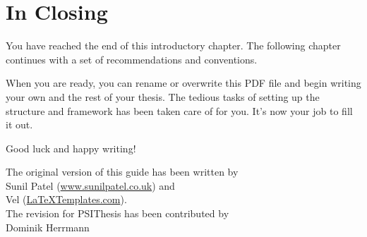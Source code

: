 \section{In Closing}

You have reached the end of this introductory chapter. The following chapter continues with a set of recommendations and conventions.

When you are ready, you can rename or overwrite this PDF file and begin writing your own  and the rest of your thesis. The tedious tasks of setting up the structure and framework has been taken care of for you. It's now your job to fill it out.

Good luck and happy writing!

\begin{flushright}
The original version of this guide has been written by\\
Sunil Patel (\href{http://www.sunilpatel.co.uk}{www.sunilpatel.co.uk}) and\\
Vel (\href{http://www.LaTeXTemplates.com}{LaTeXTemplates.com}).\\[2ex]
The revision for PSIThesis has been contributed by\\
Dominik Herrmann
\end{flushright}